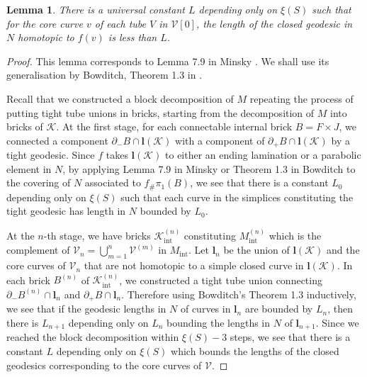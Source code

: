 \documentclass{amsart}
\newtheorem{lemma}[theorem]{Lemma}
\theoremstyle{definition}
\numberwithin{figure}{section}
\numberwithin{equation}{section}
\def\cv{\mathcal{V}}
\begin{document}
\begin{lemma}
\label{upper bound}
There is a universal constant $L$ depending only on $\xi(S)$ such that for the core curve $v$  of each tube $V$ in $\cv[0]$, the length of the closed geodesic in $N$ homotopic to $f(v)$ is less than $L$.
\end{lemma}
\begin{proof}
This lemma corresponds to Lemma 7.9 in Minsky \cite{mi2}.
We shall use its generalisation by Bowditch, Theorem 1.3 in \cite{bow2}.

Recall that we constructed a block decomposition of $M$ repeating the process of putting tight tube unions in bricks, starting from the decomposition of $M$ into bricks of $\mathcal{K}$.
At the first stage, for each connectable internal brick $B=F\times J$, we connected  a component $\partial_- B \cap \boldsymbol{l}(\mathcal{K})$ with a component of $\partial_+ B \cap \boldsymbol{l}(\mathcal{K})$ by a tight geodesic.
Since $f$ takes $\boldsymbol{l}(\mathcal{K})$  to either an ending lamination or a parabolic element in $N$, by applying Lemma 7.9 in Minsky \cite{mi2} or Theorem 1.3 in Bowditch \cite{bow2} to the covering of $N$ associated to $f_\# \pi_1(B)$, we see that there is a constant $L_0$ depending only on $\xi(S)$ such that each curve in the simplices constituting the tight geodesic has length in $N$ bounded by $L_0$.

At the $n$-th stage, we have bricks $\mathcal{K}^{(n)}_\mathrm{int}$ constituting $M_{\mathrm{int}}^{(n)}$ which is the complement of $\cv_n=\bigcup_{m=1}^n \cv^{(m)}$ in $M_{\mathrm{int}}$.
Let $\boldsymbol{l}_n$ be the union of $\boldsymbol{l}(\mathcal{K})$ and the core curves of $\cv_n$ that are not homotopic to a simple closed curve in $\boldsymbol{l}(\mathcal{K})$.
In each brick $B^{(n)}$ of $\mathcal{K}^{(n)}_\mathrm{int}$, we constructed a tight tube union connecting $\partial_- B^{(n)} \cap \boldsymbol{l}_{n}$ and $\partial_+ B \cap \boldsymbol{l}_n$.
Therefore using Bowditch's Theorem 1.3 inductively, we see that if the geodesic lengths in $N$ of curves in $\boldsymbol{l}_{n}$ are  bounded by $L_{n}$, then there is $L_{n+1}$ depending only on $L_n$ bounding the lengths in $N$ of $\boldsymbol{l}_{n+1}$.
Since we reached the block decomposition within $\xi(S)-3$ steps, we see that there is a constant $L$ depending only on $\xi(S)$ which bounds the lengths of the closed geodesics corresponding to the core curves of $\cv$.
\end{proof}
\end{document}
